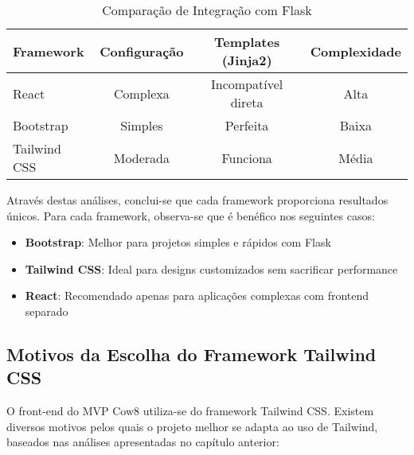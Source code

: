 \documentclass[11pt]{article}
\begin{document}
\begin{table}[H]
\centering
\caption{Comparação de Integração com Flask}
\begin{tabular}{lccc}
\toprule
\textbf{Framework} & \textbf{Configuração} & \textbf{Templates (Jinja2)} & \textbf{Complexidade} \\
\midrule
React & Complexa & Incompatível direta & Alta \\
Bootstrap & Simples & Perfeita & Baixa \\
Tailwind CSS & Moderada & Funciona & Média \\
\bottomrule
\end{tabular}
\end{table}

Através destas análises, conclui-se que cada framework proporciona resultados únicos. Para cada framework, observa-se que é benéfico nos seguintes casos:

\begin{itemize}
\item \textbf{Bootstrap}: Melhor para projetos simples e rápidos com Flask
\item \textbf{Tailwind CSS}: Ideal para designs customizados sem sacrificar performance
\item \textbf{React}: Recomendado apenas para aplicações complexas com frontend separado
\end{itemize}

\subsection{Motivos da Escolha do Framework Tailwind CSS}

O front-end do MVP Cow8 utiliza-se do framework Tailwind CSS. Existem diversos motivos pelos quais o projeto melhor se adapta ao uso de Tailwind, baseados nas análises apresentadas no capítulo anterior:
\end{document}
